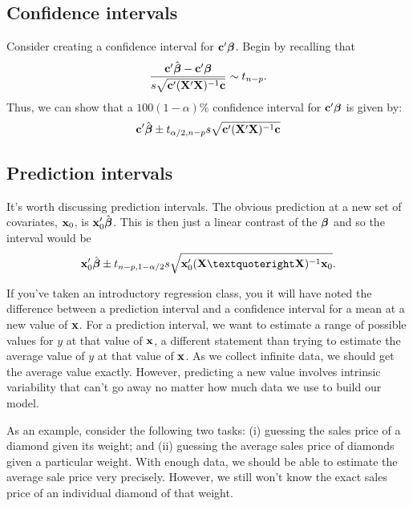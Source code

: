 \subsection{Confidence intervals}

Consider creating a confidence interval for $\mathbf{c}' \mbox{\boldmath $\beta$}$. Begin by recalling that
\begin{eqnarray*}
\frac{\mathbf{c}' \hat {\mbox{\boldmath $\beta$}} - \mathbf{c}'\mbox{\boldmath $\beta$}}{s \sqrt{\mathbf{c}' (\mathbf{X}' \mathbf{X})^{-1} \mathbf{c} }} \sim t_{n-p}.
\end{eqnarray*}
Thus, we can show that a $100(1-\alpha)\%$ confidence interval for $\mathbf{c}' \mbox{\boldmath $\beta$}$ is given by:
\begin{eqnarray*}
\mathbf{c}' \hat {\mbox{\boldmath $\beta$}}  \pm t_{\alpha/2, n-p} s {\sqrt{\mathbf{c}' (\mathbf{X}' \mathbf{X})^{-1} \mathbf{c} }}
\end{eqnarray*}



\subsection{Prediction intervals}

It's worth discussing prediction intervals. The obvious prediction
at a new set of covariates, $\mathbf{x}_0$, is $\mathbf{x}_0' \hat {\boldsymbol{\beta}}$. This is 
then just a linear contrast of the $\boldsymbol{\beta}$ and so the interval would be
$$
\bx_0' \hat \bbeta
\pm t_{n-p, 1-\alpha/2} s \sqrt{\bx_0' \xtxinv \bx_0}.
$$

If you've taken an introductory regression class, you it will have noted
the difference between a prediction interval and a confidence interval
for a mean at a new value of $\mathbf{x}$. For a prediction interval, we
want to estimate a range of possible values for $y$ at that value
of $\mathbf{x}$, a different statement than trying to estimate the average
value of $y$ at that value of $\mathbf{x}$. As we collect infinite data,
we should get the average value exactly. However, predicting a new
value involves intrinsic variability that can't go away no matter
how much data we use to build our model. 

As an example, consider the following two tasks:
(i) guessing the sales price of a diamond given its weight; and (ii)
guessing the average sales price of diamonds 
given a particular weight. With enough data, we should be able to estimate the average
sale price very precisely. However, we still won't know the exact sales
price of an individual diamond of that weight.

